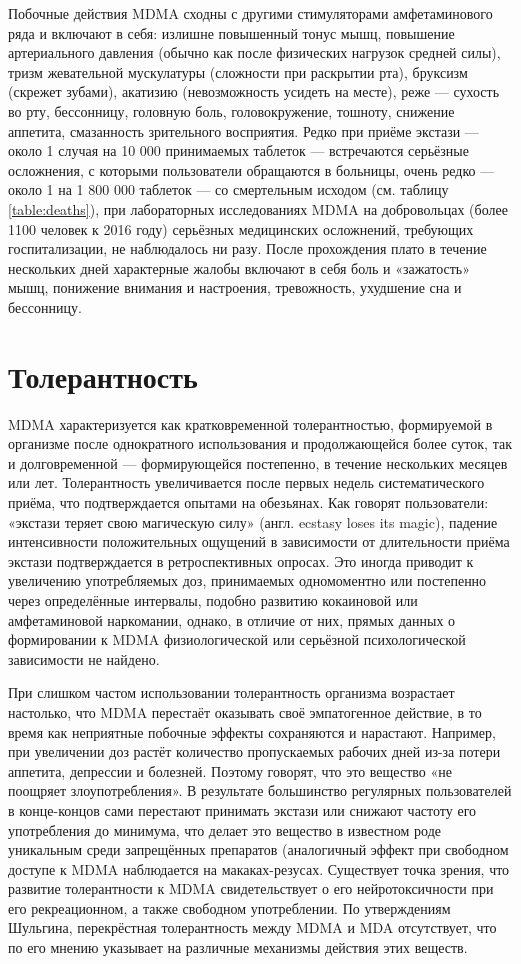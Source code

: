 \documentclass[a4paper,14pt,russian]{report}
\begin{document}
Побочные действия MDMA сходны с другими стимуляторами амфетаминового ряда и включают в себя: излишне повышенный тонус мышц, повышение артериального давления (обычно как после физических нагрузок средней силы), тризм жевательной мускулатуры (сложности при раскрытии рта), бруксизм (скрежет зубами), акатизию (невозможность усидеть на месте), реже — сухость во рту, бессонницу, головную боль, головокружение, тошноту, снижение аппетита, смазанность зрительного восприятия. Редко при приёме экстази — около 1 случая на 10 000 принимаемых таблеток — встречаются серьёзные осложнения, с которыми пользователи обращаются в больницы, очень редко — около 1 на 1 800 000 таблеток — со смертельным исходом (см. таблицу \ref{table:deaths}), при лабораторных исследованиях MDMA на добровольцах (более 1100 человек к 2016 году) серьёзных медицинских осложнений, требующих госпитализации, не наблюдалось ни разу. После прохождения плато в течение нескольких дней характерные жалобы включают в себя боль и «зажатость» мышц, понижение внимания и настроения, тревожность, ухудшение сна и бессонницу.

\section{Толерантность}
MDMA характеризуется как кратковременной толерантностью, формируемой в организме после однократного использования и продолжающейся более суток, так и долговременной — формирующейся постепенно, в течение нескольких месяцев или лет. Толерантность увеличивается после первых недель систематического приёма, что подтверждается опытами на обезьянах. Как говорят пользователи: «экстази теряет свою магическую силу» (англ. ecstasy loses its magic), падение интенсивности положительных ощущений в зависимости от длительности приёма экстази подтверждается в ретроспективных опросах. Это иногда приводит к увеличению употребляемых доз, принимаемых одномоментно или постепенно через определённые интервалы, подобно развитию кокаиновой или амфетаминовой наркомании, однако, в отличие от них, прямых данных о формировании к MDMA физиологической или серьёзной психологической зависимости не найдено.

При слишком частом использовании толерантность организма возрастает настолько, что MDMA перестаёт оказывать своё эмпатогенное действие, в то время как неприятные побочные эффекты сохраняются и нарастают. Например, при увеличении доз растёт количество пропускаемых рабочих дней из-за потери аппетита, депрессии и болезней. Поэтому говорят, что это вещество «не поощряет злоупотребления». В результате большинство регулярных пользователей в конце-концов сами перестают принимать экстази или снижают частоту его употребления до минимума, что делает это вещество в известном роде уникальным среди запрещённых препаратов (аналогичный эффект при свободном доступе к MDMA наблюдается на макаках-резусах. Существует точка зрения, что развитие толерантности к MDMA свидетельствует о его нейротоксичности при его рекреационном, а также свободном употреблении. По утверждениям Шульгина, перекрёстная толерантность между MDMA и MDA отсутствует, что по его мнению указывает на различные механизмы действия этих веществ.
\end{document}
